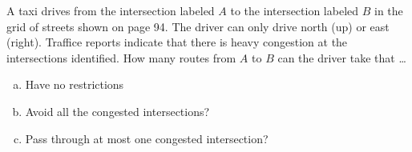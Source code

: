 \documentclass{article}
\begin{document}
\setcounter{problem}{16}
\begin{problem} %
A taxi drives from the intersection labeled $A$ to the intersection labeled $B$ in the grid of streets shown on page 94. The driver can only drive north (up) or east (right). Traffice reports indicate that there is heavy congestion at the intersections identified. How many routes from $A$ to $B$ can the driver take that \dots
\begin{enumerate}[(a)]
    \item Have no restrictions
    \item Avoid all the congested intersections?
    \item Pass through at most one congested intersection?
\end{enumerate}
\end{problem}
\end{document}
